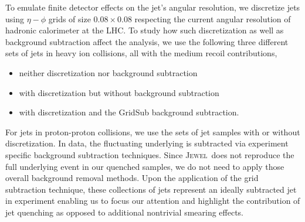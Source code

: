 \documentclass[notoc]{JHEP3}
\newcommand{\jw}{\textsc{Jewel}~}
\begin{document}

To emulate finite detector effects on the jet's angular resolution, we discretize jets using $\eta-\phi$ grids of size $0.08 \times 0.08$ respecting the current angular resolution of hadronic calorimeter at the LHC. To study how such discretization as well as background subtraction affect the analysis, we use the following three different sets of jets in heavy ion collisions, all with the medium recoil contributions,
\begin{itemize}
	\item neither discretization nor background subtraction
	\item with discretization but without background subtraction
	\item with discretization and the GridSub background subtraction.
\end{itemize}
For jets in proton-proton collisions, we use the sets of jet samples with or without discretization. In data, the fluctuating underlying is subtracted via experiment specific background subtraction techniques. Since \jw does not reproduce the full underlying event in our quenched samples, we do not need to apply those overall background removal methods. Upon the application of the grid subtraction technique, these collections of jets represent an ideally subtracted jet in experiment enabling us to focus our attention and highlight the contribution of jet quenching as opposed to additional nontrivial smearing effects.  
\end{document}

